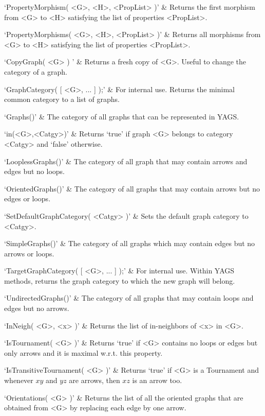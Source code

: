 `PropertyMorphism( <G>, <H>, <PropList> )' & 
Returns  the  first  morphism from <G> to <H> satisfying the list of properties <PropList>.

`PropertyMorphisms( <G>, <H>, <PropList> )' & 
Returns all morphisms from <G> to <H> satisfying the list of properties <PropList>.
\enditems


\beginitems
`CopyGraph( <G> ) ' & 
Returns a fresh copy of <G>. Useful to change the category of a graph.

`GraphCategory( [ <G>, ... ] );' & 
For internal use. Returns the minimal common category to a list of graphs.

`Graphs()' & 
The category of all  graphs  that  can  be  represented in YAGS.

`in(<G>,<Catgy>)' & 
Returns  `true'  if  graph  <G>  belongs  to  category <Catgy> and `false' otherwise.

`LooplessGraphs()' & 
The category of all graph that may contain arrows and edges but no loops.

`OrientedGraphs()' & 
The category of all graphs that may contain arrows but no edges or loops.

`SetDefaultGraphCategory( <Catgy> )' & 
Sets  the default graph category to <Catgy>.

`SimpleGraphs()' & 
The category of all graphs which may contain edges but no arrows or loops. 

`TargetGraphCategory( [ <G>, ... ] );' & 
For internal use. Within YAGS methods, returns the graph category to which the new graph will belong.

`UndirectedGraphs()' & 
The category of all graphs that may contain loops and edges but no arrows.
\enditems


\beginitems
`InNeigh( <G>, <x> )' & 
Returns the list of in-neighbors of <x> in <G>.

`IsTournament( <G> )' & 
Returns `true' if <G> contains no loops or edges but only arrows and it is maximal w.r.t. this property.

`IsTransitiveTournament( <G> )' & 
Returns `true' if <G> is a Tournament and whenever $xy$ and $yz$ are arrows, then $xz$ is an arrow too.

`Orientations( <G> )' &
Returns the list of all the oriented graphs that are obtained from <G>
by replacing each edge by one arrow. 

